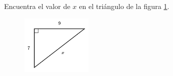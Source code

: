 \question[15]  Encuentra el valor de $x$ en el triángulo de la figura \ref{fig:lados_pitagoras_08}.
\begin{figure}[H]
    \begin{center}
        \includegraphics[width=0.3\textwidth]{../images/lados_pitagoras_08.png}
    \end{center}
    \caption{}
    \label{fig:lados_pitagoras_08}
\end{figure}